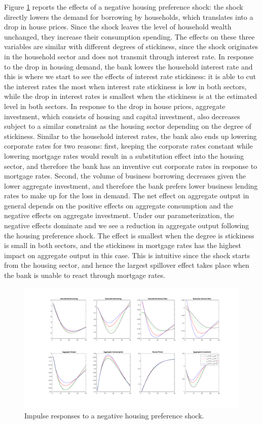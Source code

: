 \documentclass[12pt]{article}
\numberwithin{equation}{section}
\begin{document}
Figure \ref{irf_stickiness_J} reports the effects of a negative housing preference shock: the shock directly lowers the demand for borrowing by households, which translates into a drop in house prices. Since the shock leaves the level of household wealth unchanged, they increase their consumption spending. The effects on these three variables are similar with different degrees of stickiness, since the shock originates in the household sector and does not transmit through interest rate. In response to the drop in housing demand, the bank lowers the household interest rate and this is where we start to see the effects of interest rate stickiness: it is able to cut the interest rates the most when interest rate stickiness is low in both sectors, while the drop in interest rates is smallest when the stickiness is at the estimated level in both sectors. 
In response to the drop in house prices, aggregate investment, which consists of housing and capital investment, also decreases subject to a similar constraint as the housing sector depending on the degree of stickiness. Similar to the household interest rates, the bank also ends up lowering corporate rates for two reasons: first, keeping the corporate rates constant while lowering mortgage rates would result in a substitution effect into the housing sector, and therefore the bank has an inventive cut corporate rates in response to mortgage rates. Second, the volume of business borrowing decreases given the lower aggregate investment, and therefore the bank prefers lower business lending rates to make up for the loss in demand.  The net effect on aggregate output in general depends on the positive effects on aggregate consumption and the negative effects on aggregate investment. Under our parameterization, the negative effects dominate and we see a reduction in aggregate output following the housing preference shock. The effect is smallest when the degree is stickiness is small in both sectors, and the stickiness in mortgage rates has the highest impact on aggregate output in this case. This is intuitive since the shock starts from the housing sector, and hence the largest spillover effect takes place when the bank is unable to react through mortgage rates. 




\begin{figure}[H]
\centering
\caption{Impulse responses to a negative housing preference shock.}
\label{irf_stickiness_J}
\includegraphics[scale=0.4]{stickinessNegativeShocksJ.pdf}
\end{figure}
\end{document}
